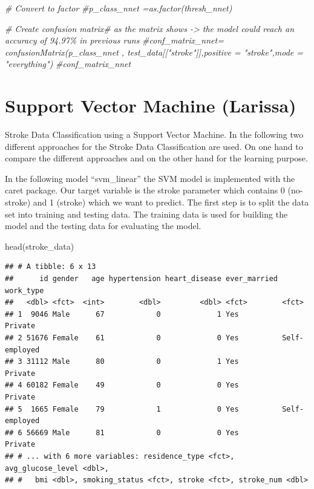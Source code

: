 \documentclass[
]{article}
\newenvironment{Shaded}{\begin{snugshade}}{\end{snugshade}}
\newcommand{\CommentTok}[1]{\textcolor[rgb]{0.56,0.35,0.01}{\textit{#1}}}
\newcommand{\FunctionTok}[1]{\textcolor[rgb]{0.00,0.00,0.00}{#1}}
\newcommand{\NormalTok}[1]{#1}
\renewcommand{\=}[1]{\stackrel{#1}{=}}
\theoremstyle{definition}
\theoremstyle{remark}
\begin{document}
\begin{Shaded}
\begin{Highlighting}[]
\CommentTok{\# Convert to factor}
\CommentTok{\#p\_class\_nnet =as.factor(thresh\_nnet)}
\end{Highlighting}
\end{Shaded}

\begin{Shaded}
\begin{Highlighting}[]
\CommentTok{\# Create confusion matrix\# as the matrix shows {-}\textgreater{} the model could reach an accuracy of 94.97\% in previous runs}
\CommentTok{\#conf\_matrix\_nnet= confusionMatrix(p\_class\_nnet , test\_data[["stroke"]],positive = "stroke",mode = "everything")}
\CommentTok{\#conf\_matrix\_nnet}
\end{Highlighting}
\end{Shaded}

\hypertarget{support-vector-machine-larissa}{%
\section{Support Vector Machine (Larissa)}\label{support-vector-machine-larissa}}

Stroke Data Classification using a Support Vector Machine. In the following two different approaches for the Stroke Data Classification are used. On one hand to compare the different approaches and on the other hand for the learning purpose.

In the following model ``svm\_linear'' the SVM model is implemented with the caret package. Our target variable is the stroke parameter which contains 0 (no-stroke) and 1 (stroke) which we want to predict. The first step is to split the data set into training and testing data. The training data is used for building the model and the testing data for evaluating the model.

\begin{Shaded}
\begin{Highlighting}[]
\FunctionTok{head}\NormalTok{(stroke\_data)}
\end{Highlighting}
\end{Shaded}

\begin{verbatim}
## # A tibble: 6 x 13
##      id gender   age hypertension heart_disease ever_married work_type    
##   <dbl> <fct>  <int>        <dbl>         <dbl> <fct>        <fct>        
## 1  9046 Male      67            0             1 Yes          Private      
## 2 51676 Female    61            0             0 Yes          Self-employed
## 3 31112 Male      80            0             1 Yes          Private      
## 4 60182 Female    49            0             0 Yes          Private      
## 5  1665 Female    79            1             0 Yes          Self-employed
## 6 56669 Male      81            0             0 Yes          Private      
## # ... with 6 more variables: residence_type <fct>, avg_glucose_level <dbl>,
## #   bmi <dbl>, smoking_status <fct>, stroke <fct>, stroke_num <dbl>
\end{verbatim}
\end{document}
